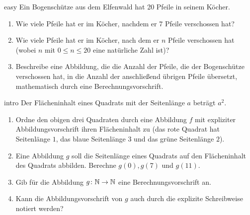 \documentclass[../abbildungen.tex]{subfiles}
\begin{document}
\begin{exercise}{easy}
    Ein Bogenschütze aus dem Elfenwald hat 20 Pfeile in seinem Köcher.
    \begin{enumerate}
        \item Wie viele Pfeile hat er im Köcher, nachdem er 7 Pfeile verschossen hat?
        \item Wie viele Pfeile hat er im Köcher, nach dem er $n$ Pfeile verschossen hat (wobei $n$ mit $0\leq n\leq 20$ eine natürliche Zahl ist)?
        \item Beschreibe eine Abbildung, die die Anzahl der Pfeile, die der Bogenschütze verschossen hat, in die Anzahl der anschließend übrigen Pfeile übersetzt, mathematisch durch eine Berechnungsvorschrift.
    \end{enumerate}
\end{exercise}
\begin{exercise}{intro}
    Der Flächeninhalt eines Quadrats mit der Seitenlänge $a$ beträgt $a^2$.
    \begin{center}
    \end{center}
    \begin{enumerate}
        \item Ordne den obigen drei Quadraten durch eine Abbildung $f$ mit expliziter Abbildungsvorschrift ihren Flächeninhalt zu (das rote Quadrat hat Seitenlänge $1$, das blaue Seitenlänge $3$ und das grüne Seitenlänge $2$).
        \item Eine Abbildung $g$ soll die Seitenlänge eines Quadrats auf den Flächeninhalt des Quadrats abbilden. Berechne $g(0), g(7)$ und $g(11)$.
        \item Gib für die Abbildung $g\colon\mathbb{N}\rightarrow\mathbb{N}$ eine Berechnungsvorschrift an.
        \item Kann die Abbildungsvorschrift von $g$ auch durch die explizite Schreibweise notiert werden?
    \end{enumerate}
\end{exercise}
\end{document}
